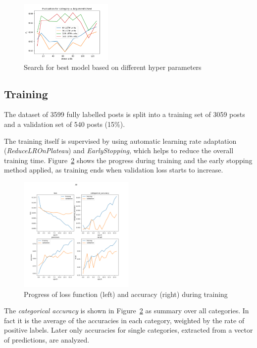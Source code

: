 \documentclass[11pt,a4paper]{article}
\begin{document}
\begin{figure}[h!]
	\centering
	\includegraphics[trim={0.1cm 0cm 0.7cm 0.7cm},clip,width=0.4\textwidth]{img/training_meta}
	\caption{Search for best model based on different hyper parameters}
	\label{fig:hyper_params}
\end{figure}


\subsection{Training}

The dataset of 3599 fully labelled posts is split into a training set of 3059 posts and a validation set of 540 posts (15\%).

The training itself is supervised by using automatic learning rate adaptation (\textit{ReduceLROnPlateau}) and \textit{EarlyStopping}, which helps to reduce the overall training time.
Figure~\ref{fig:training_loss} shows the progress during training and the early stopping method applied, as training ends when validation loss starts to increase.

\begin{figure}[h!]
	\centering
	\includegraphics[trim={1.4cm 12.4cm 2cm 2.5cm},clip,width=0.5\textwidth]{img/training_All_17}
	\caption{Progress of loss function (left) and accuracy (right) during training}
	\label{fig:training_loss}
\end{figure}

The \textit{categorical accuracy} is shown in Figure~\ref{fig:training_loss} as summary over all categories. In fact it is the average of the accuracies in each category, weighted by the rate of positive labels. Later only accuracies for single categories, extracted from a vector of predictions, are analyzed.
\end{document}
